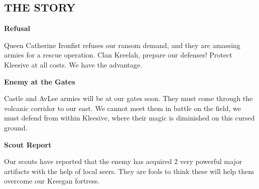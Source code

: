 \begin{multicols}{2}
\subsection*{\MakeUppercase{The Story}}

\textbf{Refusal}

Queen Catherine Ironfist refuses our ransom demand, and they are amassing armies for a rescue operation.
Clan Kreelah, prepare our defenses!
Protect Kleesive at all costs.
We have the advantage.

\textbf{Enemy at the Gates}

Castle and AvLee armies will be at our gates soon.
They must come through the volcanic corridor to our east.
We cannot meet them in battle on the field, we must defend from within Kleesive, where their magic is diminished on this cursed ground.  %

\textbf{Scout Report}

Our scouts have reported that the enemy has acquired 2 very powerful major artifacts with the help of local seers.
They are fools to think these will help them overcome our Kreegan fortress.

\end{multicols}
\vspace*{-1em}
